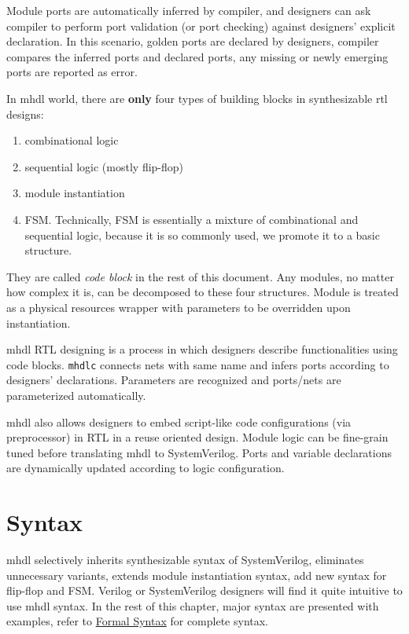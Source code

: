 \documentclass[10pt,oneside]{book}
\begin{document}
Module ports are automatically inferred by compiler, and designers can
ask compiler to perform port validation (or port checking) against
designers' explicit declaration.  In this scenario, golden ports are
declared by designers, compiler compares the inferred ports and
declared ports, any missing or newly emerging ports are reported as
error.

In mhdl world, there are \textbf{only} four types of building blocks in
synthesizable rtl designs:

\begin{enumerate}
\item combinational logic
\item sequential logic (mostly flip-flop)
\item module instantiation
\item FSM.  Technically, FSM is essentially a mixture of combinational
and sequential logic, because it is so commonly used, we promote it
to a basic structure.
\end{enumerate}

They are called \emph{code block} in the rest of this document.  Any
modules, no matter how complex it is, can be decomposed to these four
structures.  Module is treated as a physical resources wrapper with
parameters to be overridden upon instantiation.

mhdl RTL designing is a process in which designers describe
functionalities using code blocks.  \texttt{mhdlc} connects nets with same
name and infers ports according to designers' declarations.
Parameters are recognized and ports/nets are parameterized
automatically.

mhdl also allows designers to embed script-like code configurations
(via preprocessor) in RTL in a reuse oriented design.  Module logic
can be fine-grain tuned before translating mhdl to SystemVerilog.
Ports and variable declarations are dynamically updated according to
logic configuration.

\chapter{Syntax}
\label{sec:org7a8e6f7}
mhdl selectively inherits synthesizable syntax of SystemVerilog,
eliminates unnecessary variants, extends module instantiation syntax,
add new syntax for flip-flop and FSM.  Verilog or SystemVerilog
designers will find it quite intuitive to use mhdl syntax.  In the rest
of this chapter, major syntax are presented with examples, refer to
\hyperref[sec:orgbcbe461]{Formal Syntax} for complete syntax.
\end{document}
